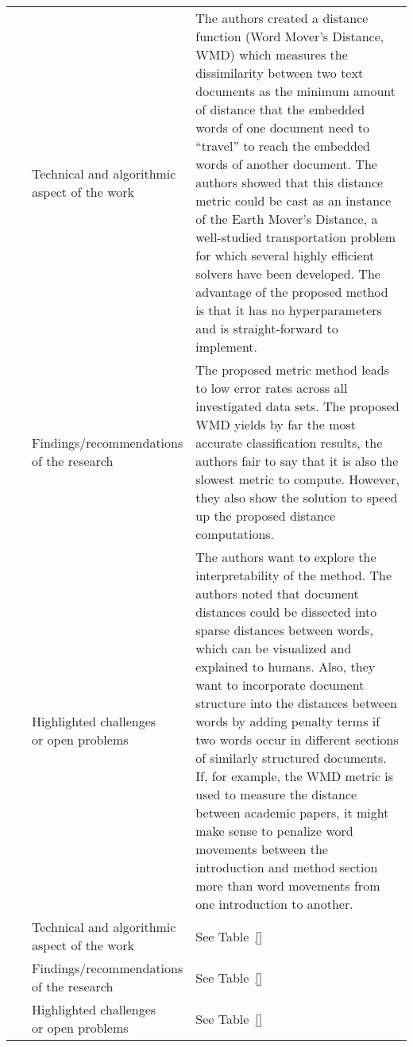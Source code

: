 \begin{landscape}
\begin{longtable}{lp{}p{}}
	\multirow{3}[0]{*}{~\citep{Kusner2015}} & 
    \specialcell{Technical and algorithmic \\ aspect of the work} &
    The authors created a distance function (Word Mover’s Distance, WMD) which measures the dissimilarity between two text documents as the minimum amount of distance that the embedded words of one document need to ``travel'' to reach the embedded words of another document. The authors showed that this distance metric could be cast as an instance of the Earth Mover’s Distance, a well-studied transportation problem for which several highly efficient solvers have been developed. The advantage of the proposed method is that it has no hyperparameters and is straight-forward to implement.      
    \\ & 
    \specialcell{Findings/recommendations \\ of the research} & 
    The proposed metric method leads to low error rates across all investigated data sets. The proposed WMD yields by far the most accurate classification results, the authors fair to say that it is also the slowest metric to compute. However, they also show the solution to speed up the proposed distance computations.
    \\ & 
    \specialcell{Highlighted challenges \\ or open problems} & 
    The authors want to explore the interpretability of the method. The authors noted that document distances could be dissected into sparse distances between words, which can be visualized and explained to humans. Also, they want to incorporate document structure into the distances between words by adding penalty terms if two words occur in different sections of similarly structured documents. If, for example, the WMD metric is used to measure the distance between academic papers, it might make sense to penalize word movements between the introduction and method section more than word movements from one introduction to another. 
	\\
	
	\multirow{3}[0]{*}{~\citep{Feng2015}} & 
    \specialcell{Technical and algorithmic \\ aspect of the work} &
    See Table~\ref{}
    \\ & 
    \specialcell{Findings/recommendations \\ of the research} & 
	See Table~\ref{} 
    \\ & 
    \specialcell{Highlighted challenges \\ or open problems} & 
	See Table~\ref{}
	\\
	

\end{longtable}
\end{landscape}
